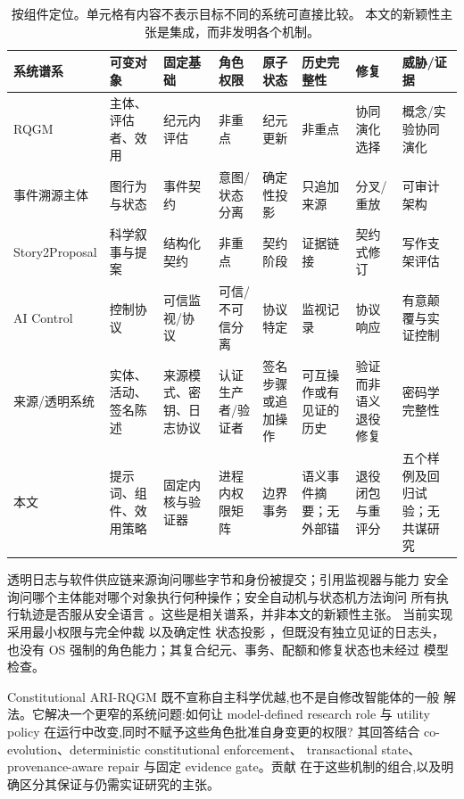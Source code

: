\begin{table}[t]
  \centering
  \scriptsize
  \begin{tabularx}{\textwidth}{@{}p{}*{7}{X}@{}}
    \toprule
    \textbf{系统谱系} & \textbf{可变对象} & \textbf{固定基础} &
    \textbf{角色权限} & \textbf{原子状态} &
    \textbf{历史完整性} & \textbf{修复} & \textbf{威胁/证据} \\
    \midrule
    RQGM \cite{iacob2026red} & 主体、评估者、效用 &
      纪元内评估 & 非重点 & 纪元更新 &
      非重点 & 协同演化选择 &
      概念/实验协同演化 \\
    事件溯源主体 \cite{nakajima2026the} & 图行为与状态 &
      事件契约 & 意图/状态分离 & 确定性投影 &
      只追加来源 & 分叉/重放 &
      可审计架构 \\
    Story2Proposal \cite{qian2026story2proposal} & 科学叙事与提案 &
      结构化契约 & 非重点 & 契约阶段 &
      证据链接 & 契约式修订 &
      写作支架评估 \\
    AI Control \cite{greenblatt2023ai} & 控制协议 &
      可信监视/协议 & 可信/不可信分离 &
      协议特定 & 监视记录 & 协议响应 &
      有意颠覆与实证控制 \\
    来源/透明系统 & 实体、活动、签名陈述 &
      来源模式、密钥、日志协议 & 认证生产者/验证者 &
      签名步骤或追加操作 & 可互操作或有见证的历史 &
      验证而非语义退役修复 & 密码学完整性 \\
    本文 & 提示词、组件、效用策略 &
      固定内核与验证器 & 进程内权限矩阵 &
      边界事务 & 语义事件摘要；无外部锚 &
      退役闭包与重评分 &
      五个样例及回归试验；无共谋研究 \\
    \bottomrule
  \end{tabularx}
  \caption{按组件定位。单元格有内容不表示目标不同的系统可直接比较。
    本文的新颖性主张是集成，而非发明各个机制。}
  \label{tab:related-comparison}
\end{table}

透明日志与软件供应链来源询问哪些字节和身份被提交；引用监视器与能力
安全询问哪个主体能对哪个对象执行何种操作；安全自动机与状态机方法询问
所有执行轨迹是否服从安全语言 \cite{schneider2000enforceable}。这些是相关谱系，并非本文的新颖性主张。
当前实现采用最小权限与完全仲裁 \cite{saltzer1975protection} 以及确定性
状态投影 \cite{schneider1990implementing}，但既没有独立见证的日志头，
也没有 OS 强制的角色能力；其复合纪元、事务、配额和修复状态也未经过
模型检查。

Constitutional ARI-RQGM 既不宣称自主科学优越,也不是自修改智能体的一般
解法。它解决一个更窄的系统问题:如何让 model-defined research role 与
utility policy 在运行中改变,同时不赋予这些角色批准自身变更的权限?
其回答结合 co-evolution、deterministic constitutional enforcement、
transactional state、provenance-aware repair 与固定 evidence gate。贡献
在于这些机制的组合,以及明确区分其保证与仍需实证研究的主张。
